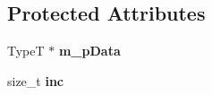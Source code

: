 \subsection*{Protected Attributes}
\begin{DoxyCompactItemize}
\item 
\hypertarget{classkeycpp_1_1_pointer_iterator_ad513bffb30233c61f684a8e8e1d0ab53}{Type\-T $\ast$ {\bfseries m\-\_\-p\-Data}}\label{classkeycpp_1_1_pointer_iterator_ad513bffb30233c61f684a8e8e1d0ab53}

\item 
\hypertarget{classkeycpp_1_1_pointer_iterator_ae2e20193e310cd9fc439a5ef7a949295}{size\-\_\-t {\bfseries inc}}\label{classkeycpp_1_1_pointer_iterator_ae2e20193e310cd9fc439a5ef7a949295}

\end{DoxyCompactItemize}

